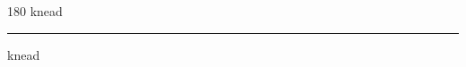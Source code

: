 
\begin{frame}
\begin{center}
\begin{turn}{180}
{\fontsize{2.5cm}{1em}\selectfont knead}
\end{turn}
\vspace{1em}\par  
\hrule
\vspace{1em}\par  
{\fontsize{2.5cm}{1em}\selectfont knead}
\end{center}
\end{frame}
